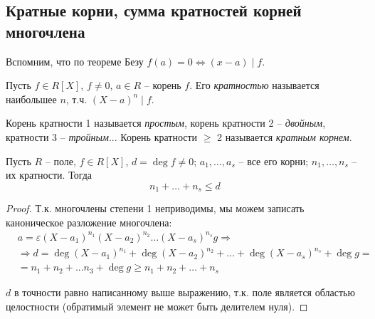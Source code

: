 
\begin{normalsize}
\section{Кратные корни, сумма кратностей корней многочлена}

Вспомним, что по теореме Безу $f(a) = 0 \Leftrightarrow (x - a) \mid f$.

\begin{conj}
Пусть $f \in R[X]$, $f \neq 0$, $a \in R$ -- корень $f$. Его 
\textit{кратностью} называется наибольшее $n$, т.ч. $(X - a)^n \mid f$.
\end{conj}
\begin{conj}
Корень кратности 1 называется \textit{простым}, корень кратности 2
-- \textit{двойным}, кратности 3 -- \textit{тройным}... Корень кратности
$\geqslant$ 2 называется \textit{кратным корнем}.
\end{conj}
\begin{theorem-non}
Пусть $R$ -- поле, $f \in R[X]$, $d = \deg f \neq 0$; $a_1, \dots, a_s$
-- все его корни; $n_1, \dots, n_s$ -- их кратности. Тогда
\[n_1 + \dots + n_s \leqslant d\]
\end{theorem-non}
\begin{proof}
Т.к. многочлены степени 1 неприводимы, мы можем записать каноническое
разложение многочлена:
\begin{align*}
    & a = \varepsilon (X - a_1)^{n_1}(X - a_2)^{n_2}\dots(X - a_s)^{n_s}g
    \Longrightarrow \\
    &\Longrightarrow d = \deg (X - a_1)^{n_1} + \deg (X - a_2)^{n_2} +
    \dots + \deg (X - a_s)^{n_s} + \deg g = \\
    & = n_1 + n_2 + ... n_3 + \deg g \geqslant n_1 + n_2 + \dots + n_s
\end{align*}

$d$ в точности равно написанному выше выражению, т.к. поле является
областью целостности (обратимый элемент не может быть делителем нуля).
\end{proof}

\end{normalsize}